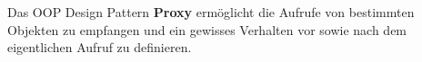 Das OOP Design Pattern \textbf{Proxy} ermöglicht die Aufrufe von bestimmten Objekten 
zu empfangen und ein gewisses Verhalten vor sowie nach dem eigentlichen Aufruf zu definieren.